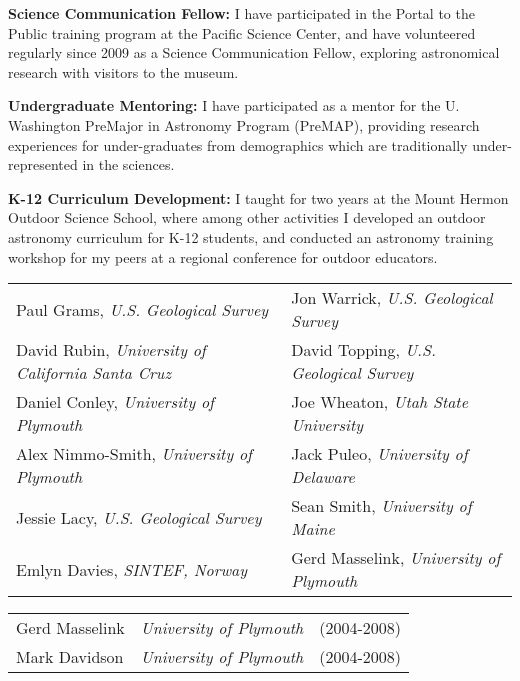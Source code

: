 \listing
{\bf Science Communication Fellow:} I have participated in the Portal to the Public training program at the Paciﬁc Science Center, and have volunteered regularly since 2009 as a Science Communication Fellow, exploring astronomical research with visitors to the museum.

\listing
{\bf Undergraduate Mentoring:} I have participated as a mentor for the U. Washington PreMajor in Astronomy Program (PreMAP), providing research experiences for under-graduates from demographics which are traditionally under-represented in the sciences.

\listing
{\bf K-12 Curriculum Development:} I taught for two years at the Mount Hermon Outdoor Science School, where among other activities I developed an outdoor astronomy curriculum for K-12 students, and conducted an astronomy training workshop for my peers at a regional conference for outdoor educators.


 \hskip -0.1in \begin{tabular}{ll}
Paul Grams, {\it U.S. Geological Survey} & Jon Warrick, {\it U.S. Geological Survey}\\
David Rubin, {\it University of California Santa Cruz} & David Topping, {\it U.S. Geological Survey}\\
Daniel Conley, {\it University of Plymouth} & Joe Wheaton, {\it Utah State University}\\
Alex Nimmo-Smith, {\it University of Plymouth} & Jack Puleo, {\it University of Delaware}\\
Jessie Lacy, {\it U.S. Geological Survey} & Sean Smith, {\it University of Maine}\\
Emlyn Davies, {\it SINTEF, Norway} & Gerd Masselink, {\it University of Plymouth}\\
\end{tabular}


\hskip -0.1in \begin{tabular}{lll}
  Gerd Masselink & {\it University of Plymouth} & (2004-2008)\\
  Mark Davidson & {\it University of Plymouth} & (2004-2008)\\
\end{tabular}


